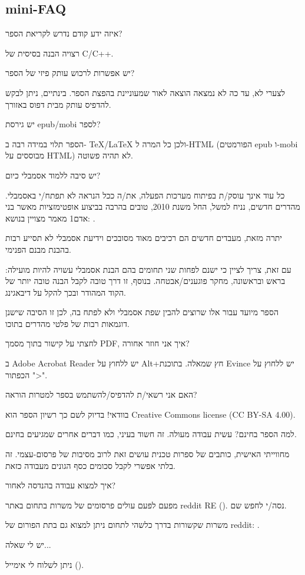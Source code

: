 \subsection*{mini-FAQ}

\par איזה ידע קודם נדרש לקריאת הספר?
\par רצויה הבנה בסיסית של C/C++.
\par יש אפשרות לרכוש עותק פיזי של הספר?
\par לצערי לא, עד כה לא נמצאה הוצאה לאור שמעוניינת בהפצת הספר. בינתיים, ניתן לבקש להדפיס עותק מבית דפוס באזורך.

\par יש גירסת epub/mobi לספר?
\par הספר תלוי במידה רבה ב- TeX/LaTeX ולכן כל המרה ל-HTML (הפורמטים epub ו-mobi מבוססים על HTML) לא תהיה פשוטה.

\par יש סיבה ללמוד אסמבלי כיום?
\par כל עוד אינך עוסק/ת בפיתוח מערכות הפעלה, את/ה ככל הנראה לא תפתח/י באסמבלי. מהדרים חדשים, נניח למשל, החל משנת 2010, טובים בהרבה בביצוע אופטימזציות מאשר בני אדם1 {מאמר מצויין בנושא: \InSqBrackets{\AgnerFog}}.

יתרה מזאת, מעבדים חדשים הם רכיבים מאוד מסובכים וידיעת אסמבלי לא תסייע רבות בהבנת מבנם הפנימי.

עם זאת, צריך לציין כי ישנם לפחות שני תחומים בהם הבנת אסמבלי עשויה להיות מועילה:
בראש ובראשונה, מחקר פוגענים/אבטחה. בנוסף, זו דרך טובה לקבל הבנה טובה יותר של הקוד המהודר ובכך להקל על דיבאגינג.

הספר מיועד עבור אלו שרוצים להבין שפת אסמבלי ולא לפתח בה, לכן זו הסיבה שישנן דוגמאות רבות של פלטי מהדרים בתוכו.

\par לחצתי על קישור בתוך מסמך PDF, איך אני חוזר אחורה?
\par ב Adobe Acrobat Reader יש ללחוץ על Alt+חץ שמאלה. בתוכנת Evince יש ללחוץ על הכפתור ">".

\par האם אני רשאי/ת להדפיס/להשתמש בספר למטרות הוראה?
\par בוודאי! בדיוק לשם כך רשיון הספר הוא Creative Commons license (CC BY-SA 4.00).

\par למה הספר בחינם? עשית עבודה מעולה. זה חשוד בעיני, כמו דברים אחרים שמגיעים בחינם.
\par מחווייתי האישית, כותבים של ספרות טכנית עושים זאת לרוב מסיבות של פרסום-עצמי. זה בלתי אפשרי לקבל סכומים כסף הגונים מעבודה כזאת.

\par איך למצוא עבודה בהנדסה לאחור?
\par מפעם לפעם עולים פרסומים של משרות בתחום באתר reddit RE\FNURLREDDIT{} (\RedditHiringThread{}). נסה/י לחפש שם.

משרות שקשורות בדרך כלשהי לתחום ניתן למצוא גם בתת הפורום  של reddit: \NetsecHiringThread{}.


\par יש לי שאלה...
\par ניתן לשלוח לי אימייל (\EMAIL).

